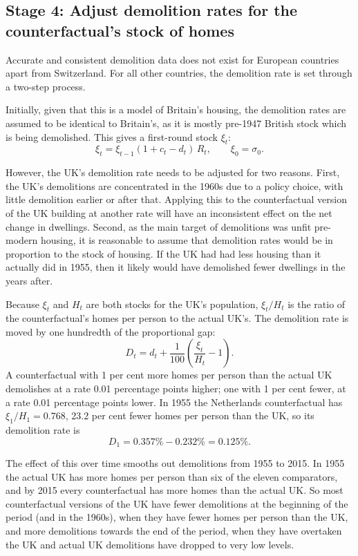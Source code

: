 \documentclass[11pt,a4paper]{article}
\begin{document}
\subsection*{Stage 4: Adjust demolition rates for the counterfactual's stock of homes}

Accurate and consistent demolition data does not exist for European countries apart from
Switzerland. For all other countries, the demolition rate is set through a two-step
process.

Initially, given that this is a model of Britain's housing, the demolition rates are
assumed to be identical to Britain's, as it is mostly pre-1947 British stock which is
being demolished. This gives a first-round stock $\xi_t$:
\[
  \xi_t = \xi_{t-1}(1 + c_t - d_t)\,R_t, \qquad \xi_0 = \sigma_0.
\]

However, the UK's demolition rate needs to be adjusted for two reasons. First, the UK's
demolitions are concentrated in the 1960s due to a policy choice, with little demolition
earlier or after that. Applying this to the counterfactual version of the UK building at
another rate will have an inconsistent effect on the net change in dwellings. Second, as
the main target of demolitions was unfit pre-modern housing, it is reasonable to assume
that demolition rates would be in proportion to the stock of housing. If the UK had had
less housing than it actually did in 1955, then it likely would have demolished fewer
dwellings in the years after.

Because $\xi_t$ and $H_t$ are both stocks for the UK's population, $\xi_t / H_t$ is the
ratio of the counterfactual's homes per person to the actual UK's. The demolition rate is
moved by one hundredth of the proportional gap:
\[
  D_t = d_t + \frac{1}{100}\left(\frac{\xi_t}{H_t} - 1\right).
\]
A counterfactual with 1 per cent more homes per person than the actual UK demolishes at a
rate 0.01 percentage points higher; one with 1 per cent fewer, at a rate 0.01 percentage
points lower. In 1955 the Netherlands counterfactual has $\xi_1 / H_1 = 0.768$, 23.2 per
cent fewer homes per person than the UK, so its demolition rate is
\[
  D_1 = 0.357\% - 0.232\% = 0.125\%.
\]

The effect of this over time smooths out demolitions from 1955 to 2015. In 1955 the actual
UK has more homes per person than six of the eleven comparators, and by 2015 every
counterfactual has more homes than the actual UK. So most counterfactual versions of the UK
have fewer demolitions at the beginning of the period (and in the 1960s), when they have
fewer homes per person than the UK, and more demolitions towards the end of the period,
when they have overtaken the UK and actual UK demolitions have dropped to very low levels.
\end{document}
